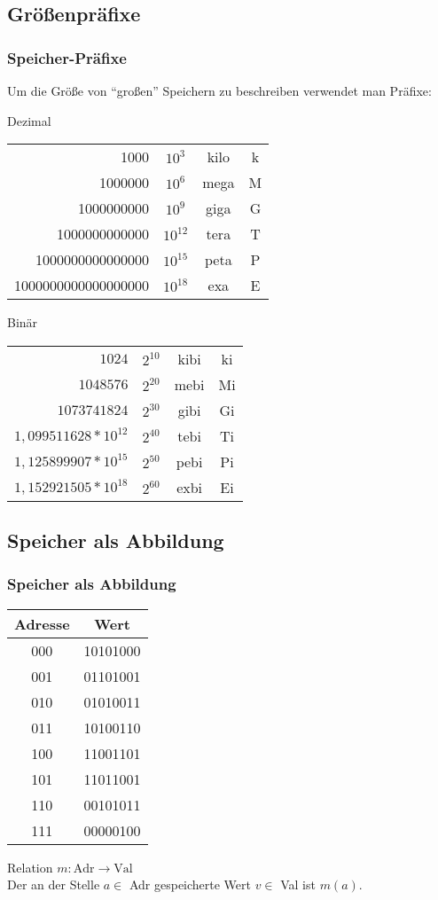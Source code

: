 \subsection{Größenpräfixe}
\begin{frame}[plain]
	\frametitle{Speicher-Präfixe}
	Um die Größe von "`großen"' Speichern zu beschreiben verwendet man Präfixe:
	\begin{block}{Dezimal}
		\begin{tabular}{rccc}
			1000&$10^{3}$&kilo&k\\
			1000000&$10^{6}$&mega&M\\
			1000000000&$10^{9}$&giga&G\\
			1000000000000&$10^{12}$&tera&T\\
			1000000000000000&$10^{15}$&peta&P\\
			1000000000000000000&$10^{18}$&exa&E\\
		\end{tabular}

	\end{block}
	\begin{block}{Binär}
		\begin{tabular}{rccc}
			$1024$&$2^{10}$&kibi&ki\\
			$1048576$&$2^{20}$&mebi&Mi\\
			$1073741824$&$2^{30}$&gibi&Gi\\
			$1,099511628*10^{12}$&$2^{40}$&tebi&Ti\\
			$1,125899907*10^{15}$&$2^{50}$&pebi&Pi\\
			$1,152921505*10^{18}$&$2^{60}$&exbi&Ei\\
		\end{tabular}
	\end{block}

\end{frame}


\subsection{Speicher als Abbildung}
\begin{frame}
	\frametitle{Speicher als Abbildung}
	\begin{tabular}{cc}
		\toprule
		Adresse&Wert\\
		\midrule
		000&10101000\\
		001&01101001\\
		010&01010011\\
		011&10100110\\
		100&11001101\\
		101&11011001\\
		110&00101011\\
		111&00000100\\
		\bottomrule
	\end{tabular}
	\begin{block}{Relation}
		$m:\text{Adr}\rightarrow\text{Val}$\\
		\vspace{.2cm}
		Der an der Stelle $a\in$ Adr gespeicherte Wert $v\in$ Val ist $m(a)$.
	\end{block}
\end{frame}


